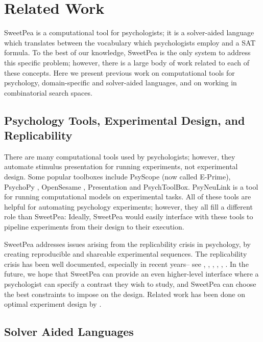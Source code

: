 

\chapter{Related Work}

SweetPea is a computational tool for psychologists; it is a solver-aided language which translates between the vocabulary which psychologists employ and a SAT formula. To the best of our knowledge, SweetPea is the only system to address this specific problem; however, there is a large body of work related to each of these concepts. Here we present previous work on computational tools for psychology, domain-specific and solver-aided languages, and on working in combinatorial search spaces.

\section{Psychology Tools, Experimental Design, and Replicability}

There are many computational tools used by psychologists; however, they automate stimulus presentation for running experiments, not experimental design. Some popular toolboxes include PsyScope \cite{cohen1993psyscope} (now called E-Prime), PsychoPy \cite{mathot2012opensesame}, OpenSesame \cite{peirce2009generating}, Presentation and PsychToolBox. PsyNeuLink is a tool for running computational models on experimental tasks. All of these tools are helpful for automating psychology experiments; however, they all fill a different role than SweetPea: Ideally, SweetPea would easily interface with these tools to pipeline experiments from their design to their execution.

SweetPea addresses issues arising from the replicability crisis in psychology, by creating reproducible and shareable experimental sequences. The replicability crisis has been well documented, especially in recent years-- see  \cite{pashler2012editors}, \cite{pashler2012replicability}, \cite{simons2014value}, \cite{schmidt2016crisis},  \cite{maxwell2015psychology}, \cite{stroebe2016most}.
In the future, we hope that SweetPea can provide an even higher-level interface where a psychologist can specify a contrast they wish to study, and SweetPea can choose the best constraints to impose on the design. Related work has been done on optimal experiment design by \cite{myung2009optimal}.


\section{Solver Aided Languages}

